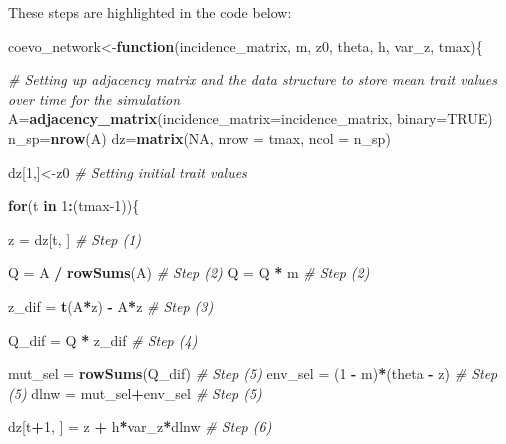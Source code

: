 \documentclass[
]{book}
\newenvironment{Shaded}{\begin{snugshade}}{\end{snugshade}}
\newcommand{\AttributeTok}[1]{\textcolor[rgb]{0.13,0.29,0.53}{#1}}
\newcommand{\CommentTok}[1]{\textcolor[rgb]{0.56,0.35,0.01}{\textit{#1}}}
\newcommand{\ConstantTok}[1]{\textcolor[rgb]{0.56,0.35,0.01}{#1}}
\newcommand{\ControlFlowTok}[1]{\textcolor[rgb]{0.13,0.29,0.53}{\textbf{#1}}}
\newcommand{\DecValTok}[1]{\textcolor[rgb]{0.00,0.00,0.81}{#1}}
\newcommand{\FunctionTok}[1]{\textcolor[rgb]{0.13,0.29,0.53}{\textbf{#1}}}
\newcommand{\NormalTok}[1]{#1}
\newcommand{\OtherTok}[1]{\textcolor[rgb]{0.56,0.35,0.01}{#1}}
\newcommand{\SpecialCharTok}[1]{\textcolor[rgb]{0.81,0.36,0.00}{\textbf{#1}}}
\begin{document}
These steps are highlighted in the code below:

\begin{Shaded}
\begin{Highlighting}[]
\NormalTok{coevo\_network}\OtherTok{\textless{}{-}}\ControlFlowTok{function}\NormalTok{(incidence\_matrix, m, z0, theta, h, var\_z, tmax)\{}
  
  \CommentTok{\# Setting up adjacency matrix and the data structure to store mean trait values over time for the simulation}
\NormalTok{  A}\OtherTok{=}\FunctionTok{adjacency\_matrix}\NormalTok{(}\AttributeTok{incidence\_matrix=}\NormalTok{incidence\_matrix, }\AttributeTok{binary=}\ConstantTok{TRUE}\NormalTok{)}
\NormalTok{  n\_sp}\OtherTok{=}\FunctionTok{nrow}\NormalTok{(A)}
\NormalTok{  dz}\OtherTok{=}\FunctionTok{matrix}\NormalTok{(}\ConstantTok{NA}\NormalTok{, }\AttributeTok{nrow =}\NormalTok{ tmax, }\AttributeTok{ncol =}\NormalTok{ n\_sp)}
  
\NormalTok{  dz[}\DecValTok{1}\NormalTok{,]}\OtherTok{\textless{}{-}}\NormalTok{z0 }\CommentTok{\# Setting initial trait values}
  
  \ControlFlowTok{for}\NormalTok{(t }\ControlFlowTok{in} \DecValTok{1}\SpecialCharTok{:}\NormalTok{(tmax}\DecValTok{{-}1}\NormalTok{))\{}
    
\NormalTok{    z }\OtherTok{=}\NormalTok{ dz[t, ] }\CommentTok{\# Step (1)}
    
\NormalTok{    Q }\OtherTok{=}\NormalTok{ A }\SpecialCharTok{/} \FunctionTok{rowSums}\NormalTok{(A) }\CommentTok{\# Step (2)}
\NormalTok{    Q }\OtherTok{=}\NormalTok{ Q }\SpecialCharTok{*}\NormalTok{ m }\CommentTok{\# Step (2)}
    
\NormalTok{    z\_dif }\OtherTok{=} \FunctionTok{t}\NormalTok{(A}\SpecialCharTok{*}\NormalTok{z) }\SpecialCharTok{{-}}\NormalTok{ A}\SpecialCharTok{*}\NormalTok{z }\CommentTok{\# Step (3)}
    
\NormalTok{    Q\_dif }\OtherTok{=}\NormalTok{ Q }\SpecialCharTok{*}\NormalTok{ z\_dif }\CommentTok{\# Step (4)}
    
\NormalTok{    mut\_sel }\OtherTok{=} \FunctionTok{rowSums}\NormalTok{(Q\_dif) }\CommentTok{\# Step (5)}
\NormalTok{    env\_sel }\OtherTok{=}\NormalTok{ (}\DecValTok{1} \SpecialCharTok{{-}}\NormalTok{ m)}\SpecialCharTok{*}\NormalTok{(theta }\SpecialCharTok{{-}}\NormalTok{ z) }\CommentTok{\# Step (5)}
\NormalTok{    dlnw }\OtherTok{=}\NormalTok{ mut\_sel}\SpecialCharTok{+}\NormalTok{env\_sel }\CommentTok{\# Step (5)}
    
\NormalTok{    dz[t}\SpecialCharTok{+}\DecValTok{1}\NormalTok{, ] }\OtherTok{=}\NormalTok{ z }\SpecialCharTok{+}\NormalTok{ h}\SpecialCharTok{*}\NormalTok{var\_z}\SpecialCharTok{*}\NormalTok{dlnw }\CommentTok{\# Step (6)}
    

\end{Highlighting}
\end{Shaded}
\end{document}
